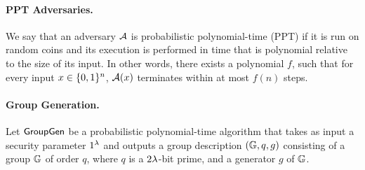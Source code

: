 \paragraph{PPT Adversaries.}
We say that an adversary $\mathcal{A}$ is probabilistic polynomial-time (PPT) if it is run on
random coins and its execution is performed in time that is polynomial relative to the size of its input.
In other words,
there exists a polynomial $f$,
such that for every input $x \in \{ 0, 1\}^n$,
$\mathcal{A}(x)$ terminates within at most $f(n)$ steps.

\paragraph{Group Generation.}
Let $\mathsf{GroupGen}$ be a probabilistic polynomial-time algorithm that takes as input a security parameter
$1^{\lambda}$ and outputs a group description $(\mathbb{G}, q, g)$ consisting of a group $\mathbb{G}$ of order $q$,
where $q$ is a $2\lambda$-bit prime,
and a generator $g$ of $\mathbb{G}$.
